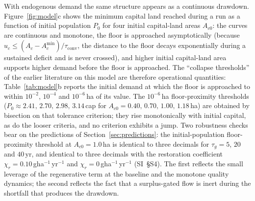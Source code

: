 \documentclass[preprint,12pt,authoryear]{elsarticle}
\newcommand{\Acmin}{A_c^{\min}}
\newcommand{\tconv}{\tau_{\mathrm{conv}}}
\begin{document}
With endogenous demand the same structure appears as a continuous drawdown. Figure~\ref{fig:model}c shows the minimum capital land reached during a run as a function of initial population $P_0$ for four initial capital-land areas $A_{c0}$: the curves are continuous and monotone, the floor is approached asymptotically (because $u_c\le(A_c-\Acmin)/\tconv$, the distance to the floor decays exponentially during a sustained deficit and is never crossed), and higher initial capital-land area supports higher demand before the floor is approached. The ``collapse thresholds'' of the earlier literature on this model are therefore operational quantities: Table~\ref{tab:model}b reports the initial demand at which the floor is approached to within $10^{-2}$, $10^{-4}$ and $10^{-6}$\,ha of its value. The $10^{-6}$\,ha floor-proximity thresholds ($P_0\approx2.41,\,2.70,\,2.98,\,3.14$\,cap for $A_{c0}=0.40,\,0.70,\,1.00,\,1.18$\,ha) are obtained by bisection on that tolerance criterion; they rise monotonically with initial capital, as do the looser criteria, and no criterion exhibits a jump. Two robustness checks bear on the predictions of Section~\ref{sec:predictions}: the initial-population floor-proximity threshold at $A_{c0}=1.0$\,ha is identical to three decimals for $\tau_g=5$, $20$ and $40$\,yr, and identical to three decimals with the restoration coefficient $\chi_r=0.10$\,gha$^{-1}$\,yr$^{-1}$ and $\chi_r=0$\,gha$^{-1}$\,yr$^{-1}$ (SI~\S S4). The first reflects the small leverage of the regenerative term at the baseline and the monotone quality dynamics; the second reflects the fact that a surplus-gated flow is inert during the shortfall that produces the drawdown.
\end{document}
